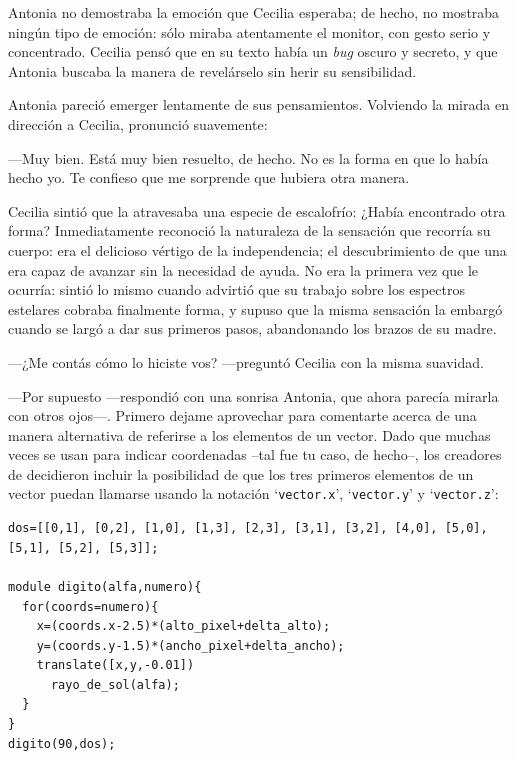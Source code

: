 Antonia no demostraba la emoción que Cecilia esperaba; de hecho, no
mostraba ningún tipo de emoción: sólo miraba atentamente el monitor,
con gesto serio y concentrado. Cecilia pensó que en su texto había un
\emph{bug} oscuro y secreto, y que Antonia buscaba la manera de
revelárselo sin herir su sensibilidad.

Antonia pareció emerger lentamente de sus pensamientos. Volviendo la
mirada en dirección a Cecilia, pronunció suavemente:

---Muy bien. Está muy bien resuelto, de hecho. No es la forma en que
lo había hecho yo. Te confieso que me sorprende que hubiera otra
manera.

Cecilia sintió que la atravesaba una especie de escalofrío: ¿Había
encontrado otra forma? Inmediatamente reconoció la naturaleza de la
sensación que recorría su cuerpo: era el delicioso vértigo de la
independencia; el descubrimiento de que una era capaz de avanzar sin
la necesidad de ayuda. No era la primera vez que le ocurría: sintió lo
mismo cuando advirtió que su trabajo sobre los espectros estelares
cobraba finalmente forma, y supuso que la misma sensación la embargó
cuando se largó a dar sus primeros pasos, abandonando los brazos de su
madre.

---¿Me contás cómo lo hiciste vos? ---preguntó Cecilia con la misma
suavidad.

     
---Por supuesto ---respondió con una sonrisa Antonia, que ahora
parecía mirarla con otros ojos---. Primero dejame aprovechar para
comentarte acerca de una manera alternativa de referirse a los
elementos de un vector. Dado que muchas veces se usan para indicar
coordenadas --tal fue tu caso, de hecho--, los creadores de
\openscad{} decidieron incluir la posibilidad de que los tres primeros
elementos de un vector puedan llamarse usando la notación
`\lstinline!vector.x!', `\lstinline!vector.y!' y
`\lstinline!vector.z!':
     


\begin{lstlisting}
dos=[[0,1], [0,2], [1,0], [1,3], [2,3], [3,1], [3,2], [4,0], [5,0], [5,1], [5,2], [5,3]];

module digito(alfa,numero){
  for(coords=numero){
    x=(coords.x-2.5)*(alto_pixel+delta_alto);
    y=(coords.y-1.5)*(ancho_pixel+delta_ancho);
    translate([x,y,-0.01])
      rayo_de_sol(alfa);
  }
}
digito(90,dos);
\end{lstlisting}


